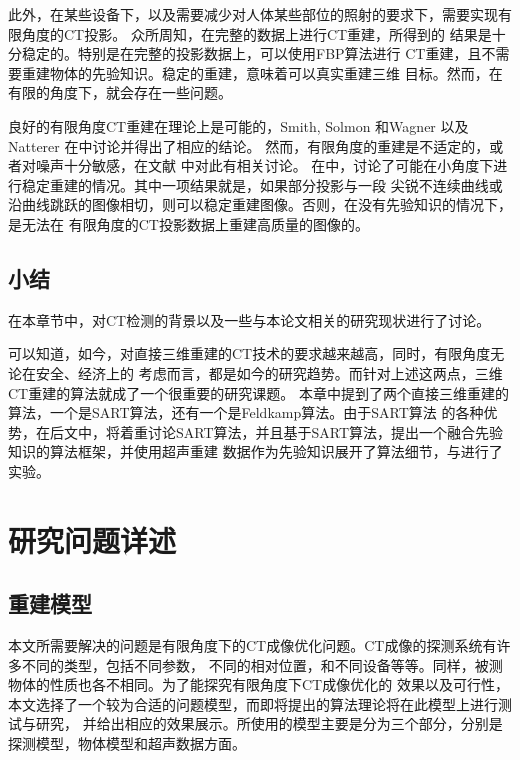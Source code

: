 此外，在某些设备下，以及需要减少对人体某些部位的照射的要求下，需要实现有限角度的CT投影。
众所周知，在完整的数据上进行CT重建，所得到的
结果是十分稳定的。特别是在完整的投影数据上，可以使用FBP算法进行
CT重建，且不需要重建物体的先验知识。稳定的重建，意味着可以真实重建三维
目标。然而，在有限的角度下，就会存在一些问题。

良好的有限角度CT重建在理论上是可能的，Smith, Solmon 和Wagner\cite{smith1977practical}
以及Natterer 在\cite{natterer2002mathematics}中讨论并得出了相应的结论。
然而，有限角度的重建是不适定的，或者对噪声十分敏感，在文献
\cite{davison1983ill}\cite{maass1987x}中对此有相关讨论。
在\cite{quinto1993singularities}中，讨论了可能在小角度下进行稳定重建的情况。其中一项结果就是，如果部分投影与一段
尖锐不连续曲线或沿曲线跳跃的图像相切，则可以稳定重建图像。否则，在没有先验知识的情况下，是无法在
有限角度的CT投影数据上重建高质量的图像的。
\section{小结}
在本章节中，对CT检测的背景以及一些与本论文相关的研究现状进行了讨论。

可以知道，如今，对直接三维重建的CT技术的要求越来越高，同时，有限角度无论在安全、经济上的
考虑而言，都是如今的研究趋势。而针对上述这两点，三维CT重建的算法就成了一个很重要的研究课题。
本章中提到了两个直接三维重建的算法，一个是SART算法，还有一个是Feldkamp算法。由于SART算法
的各种优势，在后文中，将着重讨论SART算法，并且基于SART算法，提出一个融合先验知识的算法框架，并使用超声重建
数据作为先验知识展开了算法细节，与进行了实验。


\chapter{研究问题详述}
\section{重建模型}
本文所需要解决的问题是有限角度下的CT成像优化问题。CT成像的探测系统有许多不同的类型，包括不同参数，
不同的相对位置，和不同设备等等。同样，被测物体的性质也各不相同。为了能探究有限角度下CT成像优化的
效果以及可行性，本文选择了一个较为合适的问题模型，而即将提出的算法理论将在此模型上进行测试与研究，
并给出相应的效果展示。所使用的模型主要是分为三个部分，分别是探测模型，物体模型和超声数据方面。
